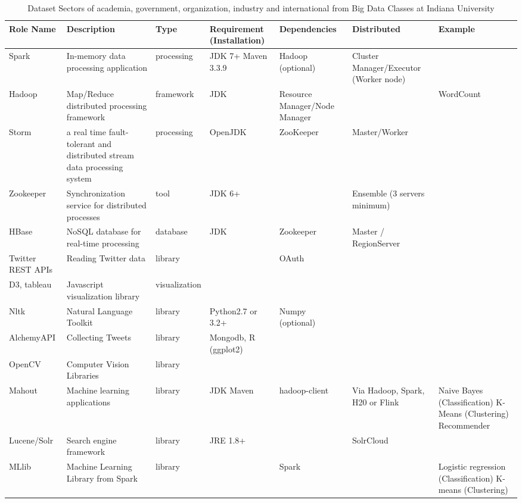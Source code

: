 \documentclass[9pt,twocolumn,twoside]{styles/osajnl}
\begin{document}
\begin{table}[p]
  \begin{center}
    \begin{small}
      \caption{Dataset Sectors of academia, government, organization,
        industry and international from Big Data Classes at Indiana
        University}
      \label{tab:dataset-sector-iu}
      \begin{tabular}{l|m{3cm}|l|m{2cm}|m{2cm}|m{2cm}|m{2cm}}

	Role Name & Description & Type & Requirement (Installation) & Dependencies & Distributed & Example \tabularnewline \hline \hline
	Spark & In-memory data processing application & processing & JDK 7+ Maven 3.3.9 & Hadoop (optional) & 	Cluster Manager/Executor (Worker node) & 	  \\ \hline
	Hadoop & Map/Reduce distributed processing framework & framework & JDK & Resource Manager/Node Manager & & WordCount   \\ \hline
	Storm &	a real time fault-tolerant and distributed stream data processing system & processing & OpenJDK & ZooKeeper & Master/Worker &	\\ \hline
	Zookeeper & Synchronization service for distributed processes & tool & JDK 6+ &  & Ensemble (3 servers minimum) & 	\\ \hline
	HBase &	NoSQL database for real-time processing & database & JDK & Zookeeper & Master / RegionServer & \\ \hline
	Twitter REST APIs & Reading Twitter data & library & 	 & OAuth & &  \\ \hline
	D3, tableau &  Javascript visualization library & visualization & &  & &  \\ \hline
	Nltk & Natural Language Toolkit & library & Python2.7 or 3.2+ & Numpy (optional) & 	 & \\ \hline
	AlchemyAPI & Collecting Tweets & library & Mongodb, R (ggplot2) & 	 &  & \\ \hline
	OpenCV & Computer Vision Libraries & library &  & &  &  \\ \hline
	Mahout & Machine learning applications & library & JDK Maven & hadoop-client & Via Hadoop, Spark, H20 or Flink & Naive Bayes (Classification) K-Means (Clustering) Recommender \\ \hline
	Lucene/Solr & Search engine framework & library & JRE 1.8+ & 	 & SolrCloud & 	 \\ \hline
	MLlib & Machine Learning Library from Spark & library & & Spark & & Logistic regression (Classification) K-means (Clustering) \\ \hline

\end{tabular}
\end{small}
\end{center}
\end{table}
\end{document}
